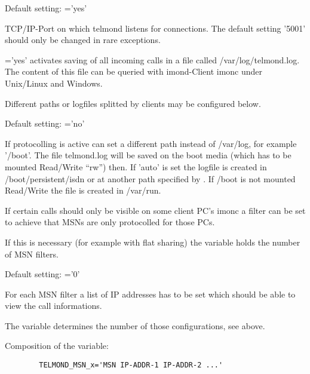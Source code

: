 Default setting: ='yes'

\begin{description}

  
  TCP/IP-Port on which telmond listens for connections.  The default 
  setting '5001' should only be changed in rare exceptions.


  
  ='yes' activates saving of all incoming calls in 
  a file called /var/log/telmond.log. The content of this file can be 
  queried with imond-Client imonc under Unix/Linux and Windows.
  
  Different paths or logfiles splitted by clients may be configured 
  below.
  
  Default setting: ='no'

  
  If protocolling is active  can set a different path 
  instead of /var/log, for example '/boot'. The file telmond.log will be saved on 
  the boot media (which has to be mounted Read/Write ``rw'') then. If 'auto' is set 
  the logfile is created in /boot/persistent/isdn or at another path specified by 
  . If /boot is not mounted Read/Write the file is created in 
  /var/run.

  
  If certain calls should only be visible on some client PC's imonc a filter 
  can be set to achieve that MSNs are only protocolled for those PCs.
  
  If this is necessary (for example with flat sharing) the variable 
   holds the number of MSN filters.
  
  Default setting: ='0'

  
  For each MSN filter a list of IP addresses has to be set which should be able 
  to view the call informations.
  
  The variable  determines the number of those 
  configurations, see above.
  
  Composition of the variable:
\begin{example}
\begin{verbatim}
        TELMOND_MSN_x='MSN IP-ADDR-1 IP-ADDR-2 ...'
\end{verbatim}
\end{example}


\end{description}
